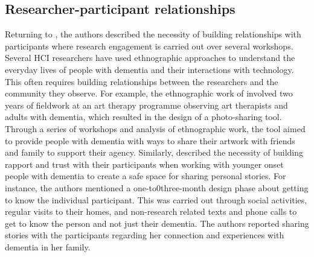 \subsection{Researcher-participant relationships}
\label{BL:Trust}
Returning to \cite{lindsay_empathy_2012}, the authors described the necessity of building relationships with participants where research engagement is carried out over several workshops. Several HCI researchers have used ethnographic approaches to understand the everyday lives of people with dementia and their interactions with technology. This often requires building relationships between the researchers and the community they observe. For example, the ethnographic work of \cite{lazar_supporting_2017} involved two years of fieldwork at an art therapy programme observing art therapists and adults with dementia, which resulted in the design of a photo-sharing tool. Through a series of workshops and analysis of ethnographic work, the tool aimed to provide people with dementia with ways to share their artwork with friends and family to support their agency. Similarly, \cite{bell2019collaborative} described the necessity of building rapport and trust with their participants when working with younger onset people with dementia to create a safe space for sharing personal stories. For instance, the authors mentioned a one-to0three-month design phase about getting to know the individual participant. This was carried out through social activities, regular visits to their homes, and non-research related texts and phone calls to get to know the person and not just their dementia. The authors reported sharing stories with the participants regarding her connection and experiences with dementia in her family. 

